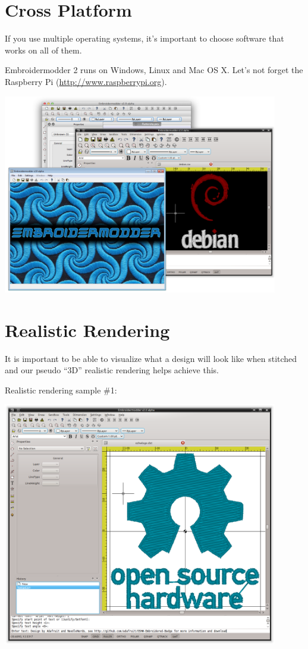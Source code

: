 \documentclass{report}
\begin{document}
\section{Cross Platform}

If you use multiple operating systems, it's important to choose software that works on all of them.

Embroidermodder 2 runs on Windows, Linux and Mac OS X. Let's not forget the Raspberry Pi (\url{http://www.raspberrypi.org}).

\includegraphics[width=0.9\textwidth]{images/features-platforms-1.png}

\section{Realistic Rendering}

It is important to be able to visualize what a design will look like when stitched and our pseudo ``3D'' realistic rendering helps achieve this.

Realistic rendering sample \#1:

\includegraphics[width=0.9\textwidth]{images/features-realrender-1.png}
\end{document}
